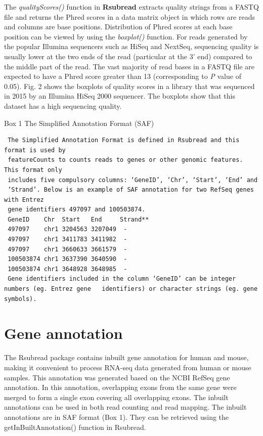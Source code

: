 \documentclass[]{book}
\begin{document}
The \emph{qualityScores()} function in \textbf{Rsubread} extracts quality strings from a FASTQ file and returns the Phred scores in a data matrix object in which rows are reads and columns are base positions. Distribution of Phred scores at each base position can be viewed by using the \emph{boxplot()} function. For reads generated by the popular Illumina sequencers such as HiSeq and NextSeq, sequencing quality is usually lower at the two ends of the read (particular at the 3' end) compared to the middle part of the read. The vast majority of read bases in a FASTQ file are expected to have a Phred score greater than 13 (corresponding to \emph{P} value of 0.05). Fig. 2 shows the boxplots of quality scores in a library that was sequenced in 2015 by an Illumina HiSeq 2000 sequencer. The boxplots show that this dataset has a high sequencing quality.

Box 1 \textbar{} The Simplified Annotation Format (SAF)

\begin{verbatim}
 The Simplified Annotation Format is defined in Rsubread and this format is used by
 featureCounts to counts reads to genes or other genomic features. This format only
 includes five compulsory columns: ‘GeneID’, ‘Chr’, ‘Start’, ‘End’ and
 ‘Strand’. Below is an example of SAF annotation for two RefSeq genes with Entrez
 gene identifiers 497097 and 100503874.
 GeneID    Chr  Start   End     Strand**
 497097    chr1 3204563 3207049  -
 497097    chr1 3411783 3411982  -
 497097    chr1 3660633 3661579  -
 100503874 chr1 3637390 3640590  -
 100503874 chr1 3648928 3648985  -
 Gene identifiers included in the column ‘GeneID’ can be integer numbers (eg. Entrez gene   identifiers) or character strings (eg. gene symbols).
\end{verbatim}

\hypertarget{gene-annotation}{%
\section{Gene annotation}\label{gene-annotation}}

The Rsubread package contains inbuilt gene annotation for human and mouse, making it convenient to process RNA-seq data generated from human or mouse samples. This annotation was generated based on the NCBI RefSeq gene annotation. In this annotation, overlapping exons from the same gene were merged to form a single exon covering all overlapping exons. The inbuilt annotations can be used in both read counting and read mapping. The inbuilt annotations are in SAF format (Box 1). They can be retrieved using the getInBuiltAnnotation() function in Rsubread.
\end{document}
